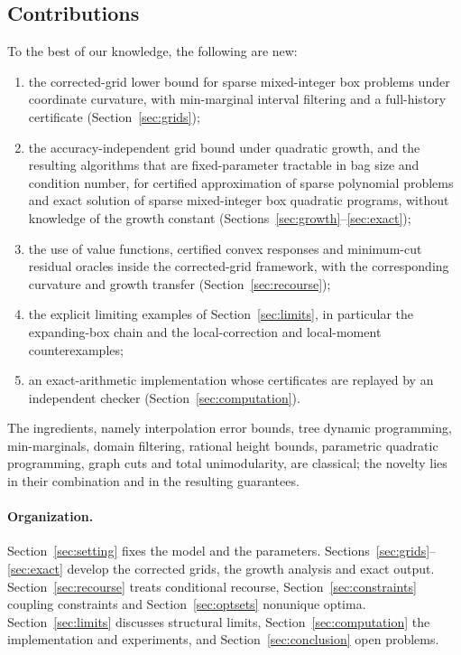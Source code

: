 \subsection{Contributions}
To the best of our knowledge, the following are new:
\begin{enumerate}[label=(\roman*)]
\item the corrected-grid lower bound for sparse mixed-integer box problems
under coordinate curvature, with min-marginal interval filtering and a
full-history certificate (Section~\ref{sec:grids});
\item the accuracy-independent grid bound under quadratic growth, and the
resulting algorithms that are fixed-parameter tractable in bag size and
condition number, for certified approximation of sparse polynomial
problems and exact solution of sparse mixed-integer box quadratic
programs, without knowledge of the growth constant
(Sections~\ref{sec:growth}--\ref{sec:exact});
\item the use of value functions, certified convex responses and
minimum-cut residual oracles inside the corrected-grid framework, with
the corresponding curvature and growth transfer
(Section~\ref{sec:recourse});
\item the explicit limiting examples of Section~\ref{sec:limits}, in
particular the expanding-box chain and the local-correction and
local-moment counterexamples;
\item an exact-arithmetic implementation whose certificates are replayed
by an independent checker (Section~\ref{sec:computation}).
\end{enumerate}
The ingredients, namely interpolation error bounds, tree dynamic
programming, min-marginals, domain filtering, rational height bounds,
parametric quadratic programming, graph cuts and total unimodularity, are
classical; the novelty lies in their combination and in the resulting
guarantees.

\paragraph{Organization.}
Section~\ref{sec:setting} fixes the model and the parameters.
Sections~\ref{sec:grids}--\ref{sec:exact} develop the corrected grids, the
growth analysis and exact output. Section~\ref{sec:recourse} treats
conditional recourse, Section~\ref{sec:constraints} coupling constraints and
Section~\ref{sec:optsets} nonunique optima. Section~\ref{sec:limits}
discusses structural limits, Section~\ref{sec:computation} the
implementation and experiments, and Section~\ref{sec:conclusion} open
problems.

